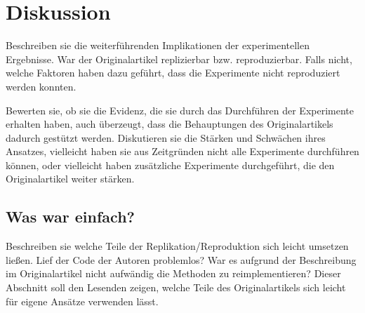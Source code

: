 \documentclass[DIV=13,fontsize=11pt]{scrartcl}
\begin{document}

\section{Diskussion}
Beschreiben sie die weiterführenden Implikationen der experimentellen Ergebnisse.
War der Originalartikel replizierbar bzw. reproduzierbar.
Falls nicht, welche Faktoren haben dazu geführt, dass die Experimente nicht reproduziert werden konnten.


Bewerten sie, ob sie die Evidenz, die sie durch das Durchführen der Experimente erhalten haben, auch überzeugt, dass die Behauptungen des Originalartikels dadurch gestützt werden.
Diskutieren sie die Stärken und Schwächen ihres Ansatzes, vielleicht haben sie aus Zeitgründen nicht alle Experimente durchführen können, oder vielleicht haben zusätzliche Experimente durchgeführt, die den Originalartikel weiter stärken.



\subsection{Was war einfach?}
Beschreiben sie welche Teile der Replikation/Reproduktion sich leicht umsetzen ließen.
Lief der Code der Autoren problemlos? War es aufgrund der Beschreibung im Originalartikel nicht aufwändig die Methoden zu reimplementieren?
Dieser Abschnitt soll den Lesenden zeigen, welche Teile des Originalartikels sich leicht für eigene Ansätze verwenden lässt.

\end{document}
